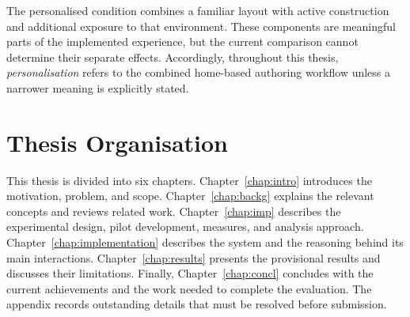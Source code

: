 The personalised condition combines a familiar layout with active construction and additional exposure to that environment. These components are meaningful parts of the implemented experience, but the current comparison cannot determine their separate effects. Accordingly, throughout this thesis, \emph{personalisation} refers to the combined home-based authoring workflow unless a narrower meaning is explicitly stated.

\section{Thesis Organisation}
This thesis is divided into six chapters. Chapter~\ref{chap:intro} introduces the motivation, problem, and scope. Chapter~\ref{chap:backg} explains the relevant concepts and reviews related work. Chapter~\ref{chap:imp} describes the experimental design, pilot development, measures, and analysis approach. Chapter~\ref{chap:implementation} describes the system and the reasoning behind its main interactions. Chapter~\ref{chap:results} presents the provisional results and discusses their limitations. Finally, Chapter~\ref{chap:concl} concludes with the current achievements and the work needed to complete the evaluation. The appendix records outstanding details that must be resolved before submission.


